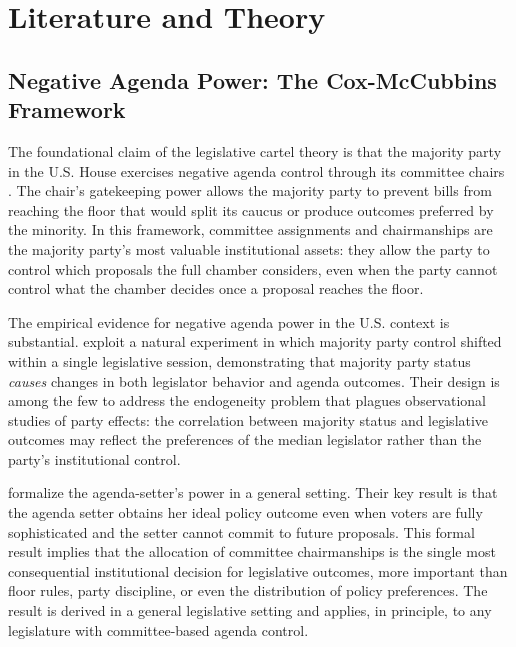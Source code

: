 \documentclass[11pt]{article}
\begin{document}
\section{Literature and Theory}
\label{sec:lit}

\subsection{Negative Agenda Power: The Cox-McCubbins Framework}

The foundational claim of the legislative cartel theory is that the majority party in the U.S. House exercises negative agenda control through its committee chairs \citep{cox2005}. The chair's gatekeeping power allows the majority party to prevent bills from reaching the floor that would split its caucus or produce outcomes preferred by the minority. In this framework, committee assignments and chairmanships are the majority party's most valuable institutional assets: they allow the party to control which proposals the full chamber considers, even when the party cannot control what the chamber decides once a proposal reaches the floor.

The empirical evidence for negative agenda power in the U.S. context is substantial. \citet{napolio2021} exploit a natural experiment in which majority party control shifted within a single legislative session, demonstrating that majority party status \textit{causes} changes in both legislator behavior and agenda outcomes. Their design is among the few to address the endogeneity problem that plagues observational studies of party effects: the correlation between majority status and legislative outcomes may reflect the preferences of the median legislator rather than the party's institutional control.

\citet{ali2023} formalize the agenda-setter's power in a general setting. Their key result is that the agenda setter obtains her ideal policy outcome even when voters are fully sophisticated and the setter cannot commit to future proposals. This formal result implies that the allocation of committee chairmanships is the single most consequential institutional decision for legislative outcomes, more important than floor rules, party discipline, or even the distribution of policy preferences. The result is derived in a general legislative setting and applies, in principle, to any legislature with committee-based agenda control.
\end{document}
